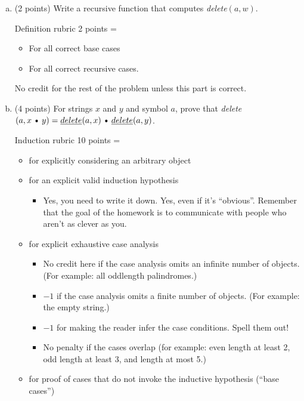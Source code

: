 \documentclass[11pt]{article}
\def\Cdot{\mathbin{\text{\normalfont \textbullet}}}
\begin{document}
\begin{enumerate}
\begin{enumerate}[(a)]
    \item (2 points) Write a recursive function that computes \emph{delete}$(a,w)$.
    \begin{Rubric}{Definition rubric}
        2 points = 
\begin{itemize}
    \item[+ 1]
    For all correct base cases
    \item[+ 1] For all correct recursive cases.
\end{itemize}
No credit for the rest of the problem unless this part is correct.
\end{Rubric}
    \item (4 points) For strings $x$ and $y$ and symbol $a$, prove that \emph{delete}$(a, x \Cdot y) = \emph{delete}(a, x) \Cdot \emph{delete}(a, y)$.
\begin{Rubric}{Induction rubric}
10 points = 
\begin{itemize}
    \item[+ 1] for explicitly considering an arbitrary object
    \item[+ 2] for an explicit valid induction hypothesis
    \begin{itemize}
        \item Yes, you need to write it down. Yes, even if it’s ``obvious''.
        Remember that the goal of the homework is to communicate with people who
        aren't as clever as you.
    \end{itemize}
    \item[+ 2] for explicit exhaustive case analysis
    \begin{itemize}
        \item No credit here if the case analysis omits an infinite number of
        objects. (For example: all oddlength palindromes.)
        \item $-1$ if the case analysis omits a finite number of objects. (For
        example: the empty string.)
        \item $-1$ for making the reader infer the case conditions. Spell them out!
        \item No penalty if the cases overlap (for example: even length at least
        2, odd length at least 3, and
        length at most 5.)
    \end{itemize}
    \item[+ 1] for proof of cases that do not invoke the inductive hypothesis (“base cases”)
    \begin{itemize}

\end{itemize}
\end{itemize}
\end{Rubric}
\end{enumerate}
\end{enumerate}
\end{document}
